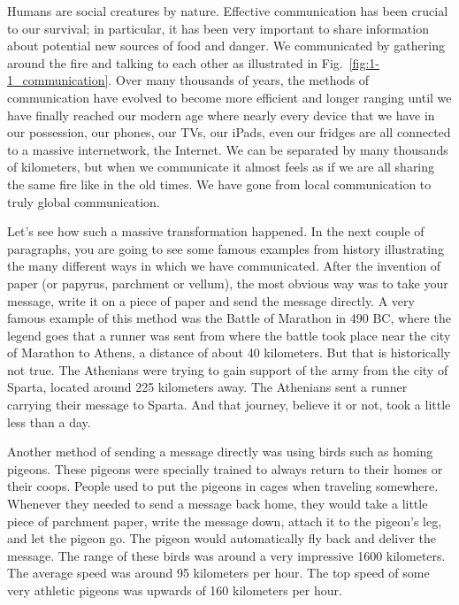 Humans are social creatures by nature.
Effective communication has been crucial to our survival;
in particular, it has been very important to share information about potential new sources of food and danger.
We communicated by gathering around the fire and talking to each other as illustrated in Fig.~\ref{fig:1-1_communication}.
Over many thousands of years, the methods of communication have evolved to become more efficient and longer ranging until we have finally reached our modern age where nearly every device that we have in our possession, our phones, our TVs, our iPads, even our fridges are all connected to a massive internetwork, the Internet.
We can be separated by many thousands of kilometers, but when we communicate it almost feels as if we are all sharing the same fire like in the old times.
We have gone from local communication to truly global communication.

Let's see how such a massive transformation happened.
In the next couple of paragraphs, you are going to see some famous examples from history illustrating the many different ways in which we have communicated.
After the invention of paper (or papyrus, parchment or vellum), the most obvious way was to take your message, write it on a piece of paper and send the message directly.
A very famous example of this method was the Battle of Marathon in 490 BC, where the legend goes that a runner was sent from where the battle took place near the city of Marathon to Athens, a distance of about 40 kilometers.
But that is historically not true.
The Athenians were trying to gain support of the army from the city of Sparta, located around 225 kilometers away.
The Athenians sent a runner carrying their message to Sparta.
And that journey, believe it or not, took a little less than a day.

Another method of sending a message directly was using birds such as homing pigeons.
These pigeons were specially trained to always return to their homes or their coops. People used to put the pigeons in cages when traveling somewhere. Whenever they needed to send a message back home, they would take a little piece of parchment paper, write the message down, attach it to the pigeon's leg, and let the pigeon go. The pigeon would automatically fly back and deliver the message.
The range of these birds was around a very impressive 1600 kilometers.
The average speed was around 95 kilometers per hour.
The top speed of some very athletic pigeons was upwards of 160 kilometers per hour.

